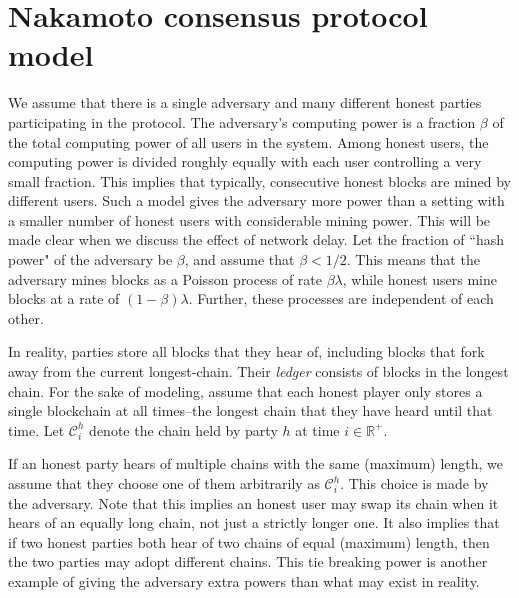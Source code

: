 \documentclass{article}
\begin{document}
\section*{Nakamoto consensus protocol model} 
We assume that there is a single adversary and many different honest parties participating in the protocol. The adversary's computing power is a fraction $\beta$ of the total computing power of all users in the system. Among honest users, the computing power is divided roughly equally with each user controlling a very small fraction. This implies that typically, consecutive honest blocks are mined by different users. Such a model gives the adversary more power than a setting with a smaller number of honest users with considerable mining power. This will be made clear when we discuss the effect of network delay. Let the fraction of ``hash power" of the adversary be $\beta$, and assume that $\beta < 1/2$. This means that the adversary mines blocks as a Poisson process of rate $\beta \lambda$, while honest users mine blocks at a rate of $(1-\beta) \lambda$. Further, these processes are independent of each other.

In reality, parties store all blocks that they hear of, including blocks that fork away from the current longest-chain. Their \textit{ledger} consists of blocks in the longest chain. For the sake of modeling, assume that each honest player only stores a single blockchain at all times--the longest chain that they have heard until that time. Let $\mathcal{C}^h_i$ denote the chain held by party $h$ at time $i \in \mathbb{R}^+$. 

If an honest party hears of multiple chains with the same (maximum) length, we assume that they choose one of them arbitrarily as $\mathcal{C}^h_i$. This choice is made by the adversary. Note that this implies an honest user may swap its chain when it hears of an equally long chain, not just a strictly longer one. It also implies that if two honest parties both hear of two chains of equal (maximum) length, then the two parties may adopt different chains. This tie breaking power is another example of giving the adversary extra powers than what may exist in reality. 
\end{document}
